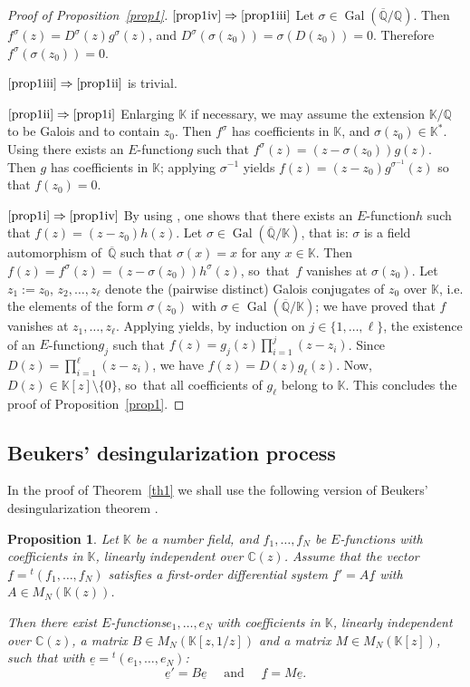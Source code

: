 \documentclass[JEP,XML,SOM,Unicode,published]{cedram}
\newcommand{\Efunction}{$E$\nobreakdash-func\-tion\xspace}
\newcommand{\Efunctions}{$E$\nobreakdash-func\-tions\xspace}
\newtheorem{prop}{Proposition}
\theoremstyle{definition}
\newcommand{\tra}{{}^t}
\newcommand{\Q}{\mathbb{Q}}
\newcommand{\C}{\mathbb{C}}
\newcommand{\K}{\mathbb{K}}
\newcommand{\Qbar}{\overline{\mathbb Q}}
\DeclareMathOperator{\Gal}{Gal}
\begin{document}
\skpt
\begin{proof}[Proof of Proposition~\ref{prop1}]
$\eqref{prop1iv}\Rightarrow \eqref{prop1iii}$ Let $\sigma \in\Gal(\Qbar/\Q)$. Then $f^\sigma(z) =D^\sigma(z) g^\sigma(z) $, and $D^\sigma(\sigma(z_0))=\sigma(D(z_0))=0$. Therefore $f^\sigma(\sigma(z_0))=0$.

$\eqref{prop1iii}\Rightarrow \eqref{prop1ii}$ is trivial.

$\eqref{prop1ii}\Rightarrow \eqref{prop1i}$ Enlarging $\K$ if necessary, we may assume the extension $\K/\Q$ to be Galois and to contain $z_0$. Then $f^\sigma$ has coefficients in $\K$, and $\sigma(z_0)\in\K^\ast$. Using \cite[Prop.\,4.1]{beukers} there exists an \Efunction $g$ such that $f^\sigma(z) = (z-\sigma(z_0))g(z)$. Then $g$ has coefficients in $\K$; applying $\sigma^{-1}$ yields $f(z) = (z-z_0)g^{\sigma^{-1}}(z)$ so that $f(z_0)=0$.

$\eqref{prop1i}\Rightarrow \eqref{prop1iv}$ By using \cite[Prop.\,4.1]{beukers}, one shows that there exists an \Efunction $h$ such that $f (z) = (z- z_0 )h(z)$. Let $\sigma \in\Gal(\Qbar/\K)$, that is: $\sigma$ is a field automorphism of~$\Qbar$ such that $\sigma(x)=x $ for any $x\in \K$. Then $f(z) = f^\sigma(z) = (z-\sigma(z_0))h^\sigma(z)$, so~that~$f$ vanishes at $\sigma(z_0)$. Let $z_1:=z_0$, $z_2,\ldots,z_\ell$ denote the (pairwise distinct) Galois conjugates of $z_0$ over $\K$, i.e. the elements of the form $\sigma(z_0)$ with $\sigma \in\Gal(\Qbar/\K)$; we have proved that $f$ vanishes at $z_1,\ldots,z_\ell$. Applying \cite[Prop.\,4.1]{beukers} yields, by induction on $j\in\{1,\ldots, \ell\}$, the existence of an \Efunction $g_j$ such that $f (z) = g_j(z) \prod_{i=1}^j (z-z_i)$. Since $D(z) = \prod_{i=1}^\ell (z-z_i)$, we have $f(z) = D(z) g_\ell(z)$. Now, $D(z)\in\K[z]\setminus\{0\}$, so~that all coefficients of $g_\ell$ belong to $\K$. This concludes the proof of Proposition~\ref{prop1}.
\end{proof}

\subsection{Beukers' desingularization process}

In the proof of Theorem~\ref{th1} we shall use the following version of Beukers' desingularization theorem \cite[Th.\,1.5]{beukers}.

\begin{prop}\label{prop2}
Let $\K$ be a number field, and $f_1,\ldots,f_N$ be \Efunctions with coefficients in $\K$, linearly independent over $\C(z)$. Assume that the vector $\underline f = \tra (f_1,\ldots,f_N)$ satisfies a first-order differential system $\underline f '=A\underline f $ with $A\in M_N(\K(z))$.

Then there exist \Efunctions $e_1,\ldots,e_N$ with coefficients in $\K$, linearly independent over $\C(z)$, a matrix $B\in M_N(\K[z,1/z])$ and a matrix $M\in M_N(\K[z ])$, such that with $\underline e = \tra (e_1,\ldots,e_N)$:
\[
\underline e '=B\underline e\quad \mbox{ and }\quad \underline f = M \underline e.
\]
\end{prop}
\end{document}
